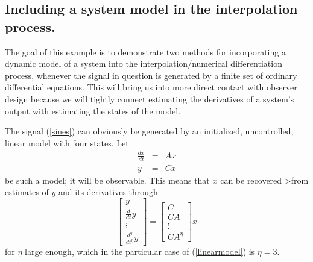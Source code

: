 \subsection{Including a system model in the interpolation process.}

The goal of this example is to demonstrate two methods for incorporating
a dynamic model of a system into the interpolation/numerical differentiation
process,
whenever the signal in question is generated by a finite set of ordinary
differential equations.
This will bring us into more direct contact with observer design because we
will tightly connect estimating the derivatives of a system's output
with estimating the states of the model.

The signal (\ref{sines}) can obviously be generated by an initialized,
uncontrolled, linear model with four states.  Let 
\begin{equation}
\begin{array}{rcl}
\frac{dx}{dt} & = &  A x  \\
y & = & C x 
\end{array}
\label{linearmodel}
\end{equation}
be such a model; it will be observable.  This means that $x$ can be recovered
>from estimates of $y$ and its derivatives through
\begin{equation} \left[ \begin{array}{r} 
y \\ \frac{d}{dt}y \\ \vdots \\ \frac{d^{\eta}}{dt^{\eta}}y
\end{array} \right] = \left[ \begin{array}{l} 
C \\ CA \\ \vdots \\ CA^{\eta}
\end{array} \right] x
\label{obsmat}
\end{equation}
for $\eta$ large enough, which in the particular case of (\ref{linearmodel}) is
$\eta = 3$.

